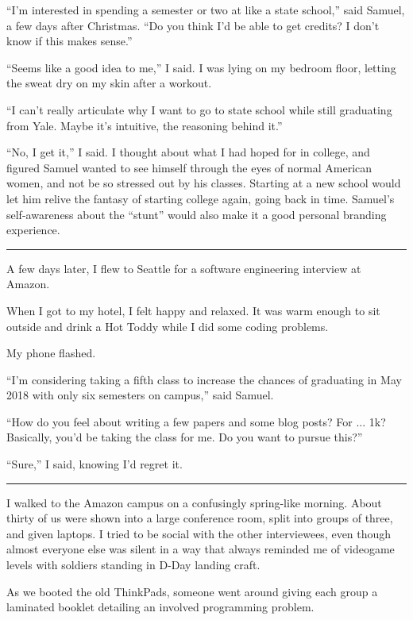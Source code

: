 ``I'm interested in spending a semester or two at like a state school,'' said
Samuel, a few days after Christmas.  ``Do you think I'd be able to get credits?
I don't know if this makes sense.''

``Seems like a good idea to me,'' I said.  I was lying on my bedroom floor,
letting the sweat dry on my skin after a workout.  

``I can't really articulate why I want to go to state school while still
graduating from Yale.   Maybe it's intuitive, the reasoning behind it.'' 

``No, I get it,'' I said.  I thought about what I had hoped for in college, and
figured Samuel wanted to see himself through the eyes of normal American women,
and not be so stressed out by his classes.  Starting at a new school would let
him relive the fantasy of starting college again, going back in time. Samuel's
self-awareness about the ``stunt'' would also make it a good personal branding
experience.    

\plainfancybreak{12pt}{2}{* * *}

A few days later, I flew to Seattle for a software engineering interview at
Amazon.

When I got to my hotel, I felt happy and relaxed. It was warm enough to sit
outside and drink a Hot Toddy while I did some coding problems. 

My phone flashed.

``I'm considering taking a fifth class to increase the chances of graduating in
May 2018 with only six semesters on campus,'' said Samuel.  

``How do you feel about writing a few papers and some blog posts?  For ... 1k?
Basically, you'd be taking the class for me.  Do you want to pursue this?'' 

``Sure,'' I said, knowing I'd regret it.

\plainfancybreak{12pt}{2}{* * *}

I walked to the Amazon campus on a confusingly spring-like morning.  About
thirty of us were shown into a large conference room, split into groups of
three, and given laptops.  I tried to be social with the other interviewees,
even though almost everyone else was silent in a way that always reminded me of
videogame levels with soldiers standing in D-Day landing craft.

As we booted the old ThinkPads, someone went around giving each group a
laminated booklet detailing an involved programming problem. 

